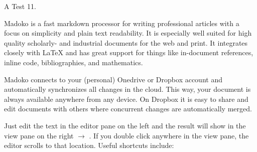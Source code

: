 \documentclass{book}
\begin{document}

\mdMaketitle{}
\begin{mdP}[data-line={9}]%
{}A Test 11.%
\end{mdP}%
\begin{mdP}[class={indent},data-line={11}]%
{}Madoko is a fast markdown processor for writing professional articles
with a focus on simplicity and plain text readability. It is especially
well suited for high quality scholarly- and industrial documents for
the web and print. It integrates closely with LaTeX and has great
support for things like in-document references, inline code,
bibliographies, and mathematics.%
\end{mdP}%
\begin{mdP}[class={indent},data-line={18}]%
{}Madoko connects to your (personal) Onedrive or Dropbox account and
automatically synchronizes all changes in the cloud. This way, your
document is always available anywhere from any device. On Dropbox it is
easy to share and edit documents with others where concurrent changes
are automatically merged.%
\end{mdP}%
\begin{mdP}[class={para-continue},data-line={26}]%
{}Just edit the text in the editor pane on the left and the result will
show in the view pane on the right %
{}\ensuremath{\rightarrow}%
{}. If you double click anywhere in
the view pane, the editor scrolls to that location. Useful shortcuts
include:%
\end{mdP}%
\end{document}
